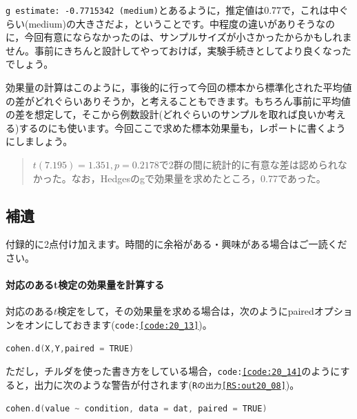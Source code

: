 \documentclass{ltjsbook}
\begin{document}
\texttt{g estimate: -0.7715342 (medium)}とあるように，推定値は0.77で，これは中ぐらい(medium)の大きさだよ，ということです。中程度の違いがありそうなのに，今回有意にならなかったのは、サンプルサイズが小さかったからかもしれません。事前にきちんと設計してやっておけば，実験手続きとしてより良くなったでしょう。

効果量の計算はこのように，事後的に行って今回の標本から標準化された平均値の差がどれぐらいありそうか，と考えることもできます。もちろん事前に平均値の差を想定して，そこから例数設計(どれぐらいのサンプルを取れば良いか考える)するのにも使います。今回ここで求めた標本効果量も，レポートに書くようにしましょう。

\begin{quote}
	$t(7.195)=1.351,p = 0.2178$で2群の間に統計的に有意な差は認められなかった。なお，Hedgesのgで効果量を求めたところ，0.77であった。
\end{quote}

\subsection{補遺}
付録的に2点付け加えます。時間的に余裕がある・興味がある場合はご一読ください。
\paragraph{対応のあるt検定の効果量を計算する}対応のある$t$検定をして，その効果量を求める場合は，次のようにpairedオプションをオンにしておきます(\texttt{code:\ref{code:20_13}})。

\begin{lstlisting}[language=c++,label={code:20_13},caption={cohenのd}]
cohen.d(X,Y,paired = TRUE)
\end{lstlisting}
ただし，チルダを使った書き方をしている場合，\texttt{code:\ref{code:20_14}}のようにすると，出力に次のような警告が付されます(\texttt{Rの出力\ref{RS:out20_08}})。
\begin{lstlisting}[language=c++,label={code:20_14},caption={cohenのdその2}]
cohen.d(value ~ condition, data = dat, paired = TRUE)
\end{lstlisting}
\end{document}
